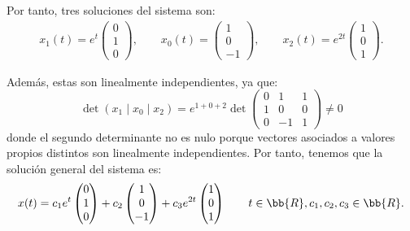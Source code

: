 \begin{ejercicio}
\begin{enumerate}
        Por tanto, tres soluciones del sistema son:
        \begin{align*}
            x_1(t) = e^t\begin{pmatrix}
                0\\
                1\\
                0
            \end{pmatrix},\qquad
            x_0(t) = \begin{pmatrix}
                1\\
                0\\
                -1
            \end{pmatrix},\qquad
            x_2(t) = e^{2t}\begin{pmatrix}
                1\\
                0\\
                1
            \end{pmatrix}.
        \end{align*}

        Además, estas son linealmente independientes, ya que:
        \begin{equation*}
            \det(x_1\mid x_0\mid x_2) = e^{1+0+2}\det\begin{pmatrix}
                0 & 1 & 1\\
                1 & 0 & 0\\
                0 & -1 & 1
            \end{pmatrix}\neq 0
        \end{equation*}
        donde el segundo determinante no es nulo porque vectores asociados a valores propios distintos son linealmente independientes. Por tanto, tenemos que la solución general del sistema es:
        \begin{equation*}
            x(t) = c_1e^t\begin{pmatrix}
                0\\
                1\\
                0
            \end{pmatrix} + c_2\begin{pmatrix}
                1\\
                0\\
                -1
            \end{pmatrix} + c_3e^{2t}\begin{pmatrix}
                1\\
                0\\
                1
            \end{pmatrix}\qquad t\in \bb{R}, c_1, c_2, c_3\in \bb{R}.
        \end{equation*}


\end{enumerate}
\end{ejercicio}
